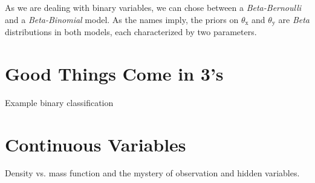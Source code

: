 \documentclass[]{report}
\begin{document}
As we are dealing with binary variables, we can chose between a \emph{Beta-Bernoulli} and a \emph{Beta-Binomial} model. As the names imply, the priors on $\theta_\mathrm{x}$ and $\theta_\mathrm{y}$ are \textit{Beta} distributions in both models, each characterized by two parameters.


\chapter{Good Things Come in 3's}
Example binary classification


\chapter{Continuous Variables}
Density vs. mass function and the mystery of observation and hidden variables.
\end{document}
